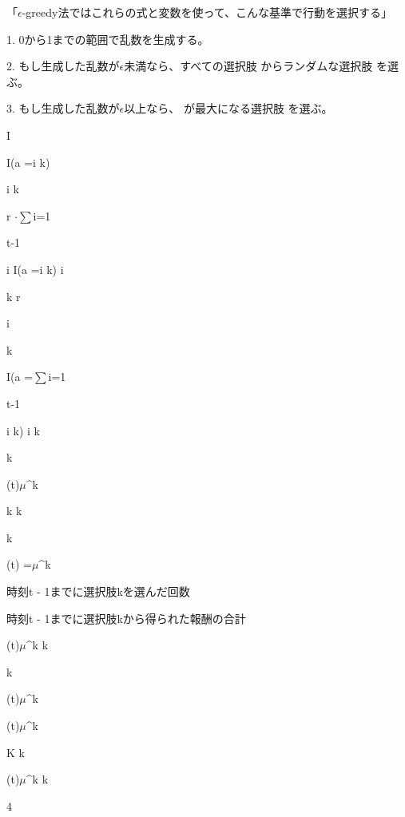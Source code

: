 「$\epsilon$-greedy法ではこれらの式と変数を使って、こんな基準で⾏動を選択する」\par
1. 0から1までの範囲で乱数を⽣成する。\par
2. もし⽣成した乱数が$\epsilon$未満なら、すべての選択肢 からランダムな選択肢 を選ぶ。\par
3. もし⽣成した乱数が$\epsilon$以上なら、 が最⼤になる選択肢 を選ぶ。\par
I\par
I(a  =i k)\par
i k\par
r  $\cdot$$\sum$i=1\par
t-1\par
i I(a  =i k) i\par
k r\par
i\par
k\par
I(a  =$\sum$i=1\par
t-1\par
i k) i k\par
k\par
(t)$\mu$\textasciicircum{}k\par
k k\par
k\par
(t) =$\mu$\textasciicircum{}k\par
時刻t - 1までに選択肢kを選んだ回数\par
時刻t - 1までに選択肢kから得られた報酬の合計\par
(t)$\mu$\textasciicircum{}k k\par
k\par
(t)$\mu$\textasciicircum{}k\par
(t)$\mu$\textasciicircum{}k\par
K k\par
(t)$\mu$\textasciicircum{}k k\par
4\par

